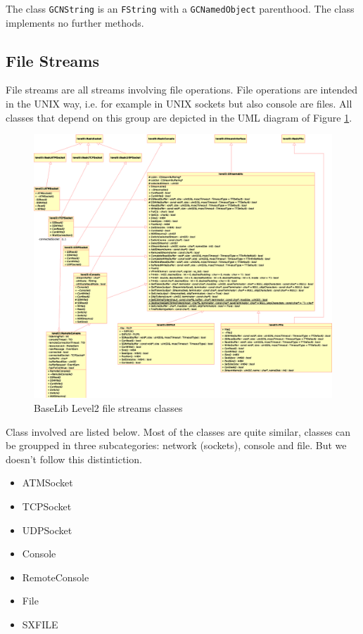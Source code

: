 The class \texttt{GCNString} is an \texttt{FString} with a \texttt{GCNamedObject} parenthood. The class implements no further methods.



\subsection{File Streams}
File streams are all streams involving file operations. File operations are intended in the UNIX way, i.e. for example in UNIX sockets but also console are files. All classes that depend on this group are depicted in the UML diagram of Figure \ref{f:level2:stream_file}.
\begin{figure}[h!]
 \begin{center}
  \includegraphics[width=\textwidth]{level2/level2-fstream.eps}
  \caption{BaseLib Level2 file streams classes}
  \label{f:level2:stream_file}
 \end{center}
\end{figure}

Class involved are listed below. Most of the classes are quite similar, classes can be groupped in three subcategories: network (sockets), console and file. But we doesn't follow this distintiction.
\begin{itemize}
 \item ATMSocket
 \item TCPSocket
 \item UDPSocket

 \item Console
 \item RemoteConsole

 \item File
 \item SXFILE
\end{itemize}



